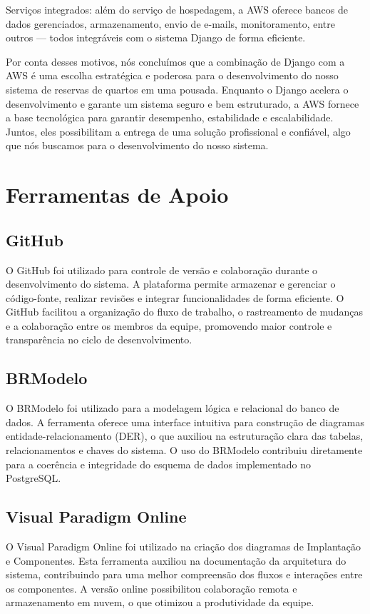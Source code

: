 \documentclass[
	12pt,				%
	openany,			%
	twoside,			%
	a4paper,			%
	english,			%
	french,				%
	spanish,			%
	brazil				%
	]{abntex2}
\begin{document}
Serviços integrados: além do serviço de hospedagem, a AWS oferece bancos de dados gerenciados, armazenamento, envio de e-mails, monitoramento, entre outros — todos integráveis com o sistema Django de forma eficiente.

Por conta desses motivos, nós concluímos que a combinação de Django com a AWS é uma escolha estratégica e poderosa para o desenvolvimento do nosso sistema de reservas de quartos em uma pousada. Enquanto o Django acelera o desenvolvimento e garante um sistema seguro e bem estruturado, a AWS fornece a base tecnológica para garantir desempenho, estabilidade e escalabilidade. Juntos, eles possibilitam a entrega de uma solução profissional e confiável, algo que nós buscamos para o desenvolvimento do nosso sistema.

\section{Ferramentas de Apoio}
\subsection{GitHub}
O GitHub foi utilizado para controle de versão e colaboração durante o desenvolvimento do sistema. A plataforma permite armazenar e gerenciar o código-fonte, realizar revisões e integrar funcionalidades de forma eficiente. O GitHub facilitou a organização do fluxo de trabalho, o rastreamento de mudanças e a colaboração entre os membros da equipe, promovendo maior controle e transparência no ciclo de desenvolvimento.
\subsection{BRModelo}
O BRModelo foi utilizado para a modelagem lógica e relacional do banco de dados. A ferramenta oferece uma interface intuitiva para construção de diagramas entidade-relacionamento (DER), o que auxiliou na estruturação clara das tabelas, relacionamentos e chaves do sistema. O uso do BRModelo contribuiu diretamente para a coerência e integridade do esquema de dados implementado no PostgreSQL.
\subsection{Visual Paradigm Online}
O Visual Paradigm Online foi utilizado na criação dos diagramas de Implantação e Componentes. Esta ferramenta auxiliou na documentação da arquitetura do sistema, contribuindo para uma melhor compreensão dos fluxos e interações entre os componentes. A versão online possibilitou colaboração remota e armazenamento em nuvem, o que otimizou a produtividade da equipe.
\end{document}
